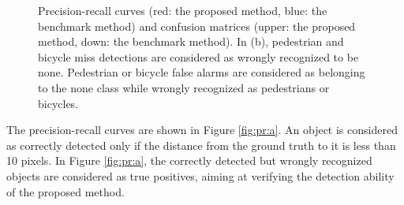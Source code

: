 \documentclass[10pt,twocolumn,letterpaper]{article}
\begin{document}
\begin{figure}
\centering
{}
\caption{Precision-recall curves (red: the proposed method, blue: the benchmark method) and confusion matrices (upper: the proposed method, down: the benchmark method). In (b), pedestrian and bicycle miss detections are considered as wrongly recognized to be none. Pedestrian or bicycle false alarms are considered as belonging to the none class while wrongly recognized as pedestrians or bicycles.}
\label{fig:pr}
\end{figure}

The precision-recall curves are shown in Figure \ref{fig:pr:a}. An object is considered as correctly detected only if the distance from the ground truth to it is less than 10 pixels. In Figure \ref{fig:pr:a}, the correctly detected but wrongly recognized objects are considered as true positives, aiming at verifying the detection ability of the proposed method.
\end{document}
